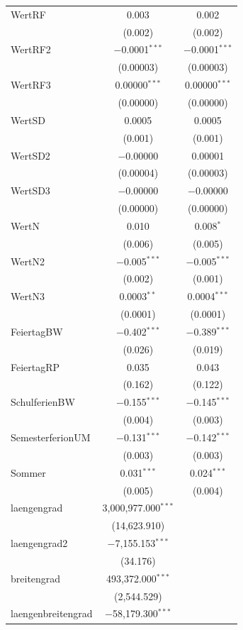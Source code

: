 \documentclass[a4paper,12pt]{thesis}
\begin{document}
\begin{longtable}{@{\extracolsep{-5pt}}lcc}
		WertRF & 0.003 & 0.002 \\ 
		& (0.002) & (0.002) \\ 
		WertRF2 & $-$0.0001$^{***}$ & $-$0.0001$^{***}$ \\ 
		& (0.00003) & (0.00003) \\ 
		WertRF3 & 0.00000$^{***}$ & 0.00000$^{***}$ \\ 
		& (0.00000) & (0.00000) \\ 
		WertSD & 0.0005 & 0.0005 \\ 
		& (0.001) & (0.001) \\ 
		WertSD2 & $-$0.00000 & 0.00001 \\ 
		& (0.00004) & (0.00003) \\ 
		WertSD3 & $-$0.00000 & $-$0.00000 \\ 
		& (0.00000) & (0.00000) \\ 
		WertN & 0.010 & 0.008$^{*}$ \\ 
		& (0.006) & (0.005) \\ 
		WertN2 & $-$0.005$^{***}$ & $-$0.005$^{***}$ \\ 
		& (0.002) & (0.001) \\ 
		WertN3 & 0.0003$^{**}$ & 0.0004$^{***}$ \\ 
		& (0.0001) & (0.0001) \\ 
		FeiertagBW & $-$0.402$^{***}$ & $-$0.389$^{***}$ \\ 
		& (0.026) & (0.019) \\ 
		FeiertagRP & 0.035 & 0.043 \\ 
		& (0.162) & (0.122) \\ 
		SchulferienBW & $-$0.155$^{***}$ & $-$0.145$^{***}$ \\ 
		& (0.004) & (0.003) \\ 
		SemesterferionUM & $-$0.131$^{***}$ & $-$0.142$^{***}$ \\ 
		& (0.003) & (0.003) \\ 
		Sommer & 0.031$^{***}$ & 0.024$^{***}$ \\ 
		& (0.005) & (0.004) \\ 
		laengengrad & 3,000,977.000$^{***}$ &  \\ 
		& (14,623.910) &  \\ 
		laengengrad2 & $-$7,155.153$^{***}$ &  \\ 
		& (34.176) &  \\ 
		breitengrad & 493,372.000$^{***}$ &  \\ 
		& (2,544.529) &  \\ 
		laengenbreitengrad & $-$58,179.300$^{***}$ &  \\ 

\end{longtable}
\end{document}
